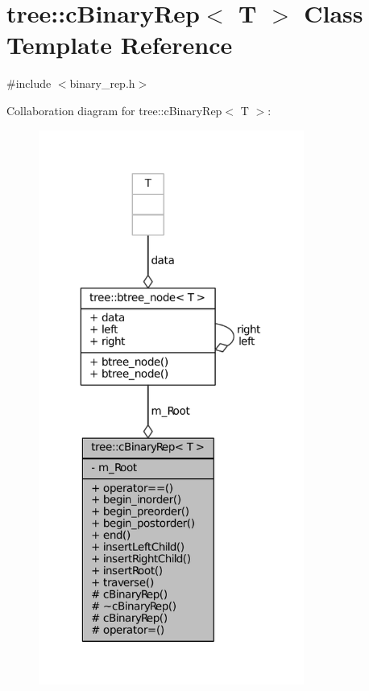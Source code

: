 \hypertarget{classtree_1_1cBinaryRep}{\section{tree\-:\-:c\-Binary\-Rep$<$ \-T $>$ \-Class \-Template \-Reference}
\label{classtree_1_1cBinaryRep}
}


{\ttfamily \#include $<$binary\-\_\-rep.\-h$>$}



\-Collaboration diagram for tree\-:\-:c\-Binary\-Rep$<$ \-T $>$\-:
\nopagebreak
\begin{figure}[H]
\begin{center}
\leavevmode
\includegraphics[width=247pt]{classtree_1_1cBinaryRep__coll__graph}
\end{center}
\end{figure}
